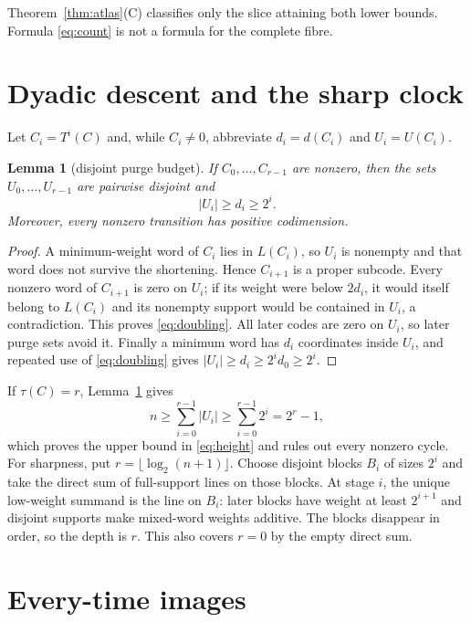\documentclass[a4paper,10pt]{amsart}
\newtheorem{lemma}[theorem]{Lemma}
\theoremstyle{remark}
\begin{document}
Theorem~\ref{thm:atlas}(C) classifies only the slice attaining both lower
bounds.  Formula \eqref{eq:count} is not a formula for the complete fibre.

\section{Dyadic descent and the sharp clock}

Let $C_i=T^i(C)$ and, while $C_i\ne0$, abbreviate
$d_i=d(C_i)$ and $U_i=U(C_i)$.

\begin{lemma}[disjoint purge budget]\label{lem:budget}
If $C_0,\ldots,C_{r-1}$ are nonzero, then the sets
$U_0,\ldots,U_{r-1}$ are pairwise disjoint and
\begin{equation}\label{eq:budget}
 |U_i|\geq d_i\geq2^i.
\end{equation}
Moreover, every nonzero transition has positive codimension.
\end{lemma}

\begin{proof}
A minimum-weight word of $C_i$ lies in $L(C_i)$, so $U_i$ is nonempty and
that word does not survive the shortening.  Hence $C_{i+1}$ is a proper
subcode.  Every nonzero word of $C_{i+1}$ is zero on $U_i$; if its weight
were below $2d_i$, it would itself belong to $L(C_i)$ and its nonempty
support would be contained in $U_i$, a contradiction.  This proves
\eqref{eq:doubling}.  All later codes are zero on $U_i$, so later purge
sets avoid it.  Finally a minimum word has $d_i$ coordinates inside $U_i$,
and repeated use of \eqref{eq:doubling} gives
$|U_i|\geq d_i\geq2^id_0\geq2^i$.
\end{proof}

If $\tau(C)=r$, Lemma~\ref{lem:budget} gives
\[
 n\geq\sum_{i=0}^{r-1}|U_i|
 \geq\sum_{i=0}^{r-1}2^i=2^r-1,
\]
which proves the upper bound in \eqref{eq:height} and rules out every
nonzero cycle.  For sharpness, put
$r=\lfloor\log_2(n+1)\rfloor$.  Choose disjoint blocks
$B_i$ of sizes $2^i$ and take the direct sum of full-support lines on those
blocks.  At stage $i$, the unique low-weight summand is the line on $B_i$:
later blocks have weight at least $2^{i+1}$ and disjoint supports make
mixed-word weights additive.  The blocks disappear in order, so the depth
is $r$.  This also covers $r=0$ by the empty direct sum.

\section{Every-time images}
\end{document}
